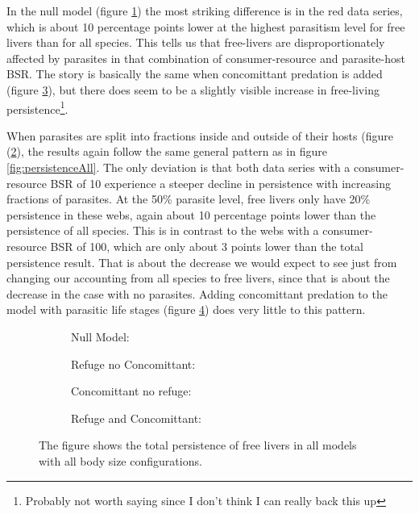 \documentclass[11pt]{amsart}
\begin{document}
In the null model (figure \ref{fig:persistenceFreea}) the most striking difference is in the red data series, which is about 10 percentage points lower at the highest parasitism level for free livers than for all species.  This tells us that free-livers are disproportionately affected by parasites in that combination of consumer-resource and parasite-host BSR.  The story is basically the same when concomittant predation is added (figure \ref{fig:persistenceFreec}), but there does seem to be a slightly visible increase in free-living persistence\footnote{Probably not worth saying since I don't think I can really back this up}.   

When parasites are split into fractions inside and outside of their hosts (figure (\ref{fig:persistenceFreeb}), the results again follow the same general pattern as in figure \ref{fig:persistenceAll}.  The only deviation is that both data series with a consumer-resource BSR of 10 experience a steeper decline in persistence with increasing fractions of parasites.  At the 50\% parasite level, free livers only have 20\% persistence in these webs, again about 10 percentage points lower than the persistence of all species. This is in contrast to the webs with a consumer-resource BSR of 100, which are only about 3 points lower than the total persistence result.  That is about the decrease we would expect to see just from changing our accounting from all species to free livers, since that is about the decrease in the case with no parasites.  Adding concomittant predation to the model with parasitic life stages (figure \ref{fig:persistenceFreed}) does very little to this pattern. 

\begin{figure}[h]
\begin{subfigure}[t]{.45\textwidth}
\caption{Null Model:\label{fig:persistenceFreea}}
\end{subfigure}
\begin{subfigure}[t]{.45\textwidth}
\caption{Refuge no Concomittant:\label{fig:persistenceFreeb}}
\end{subfigure}

\begin{subfigure}[ct]{.45\textwidth}
\caption{Concomittant no refuge:\label{fig:persistenceFreec}}
\end{subfigure}
\begin{subfigure}[ct]{.45\textwidth}
\caption{Refuge and Concomittant:\label{fig:persistenceFreed}}
\end{subfigure}
\caption{The figure shows the total persistence of free livers in all models with all body size configurations.}
\label{fig:persistenceFree}
\end{figure}
\end{document}
